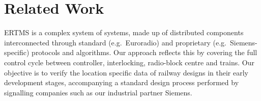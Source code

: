 \section{Related Work}
ERTMS is a complex system of systems, made up of distributed
components interconnected through standard (e.g.\ Euroradio) and
proprietary (e.g.\ Siemens-specific) protocols and algorithms. Our
approach reflects this by covering the full control cycle between
controller, interlocking, radio-block centre and trains. Our objective
is to verify the location specific data of railway designs in their
early development stages, accompanying a standard design process
performed by signalling companies such as our industrial partner
Siemens.



